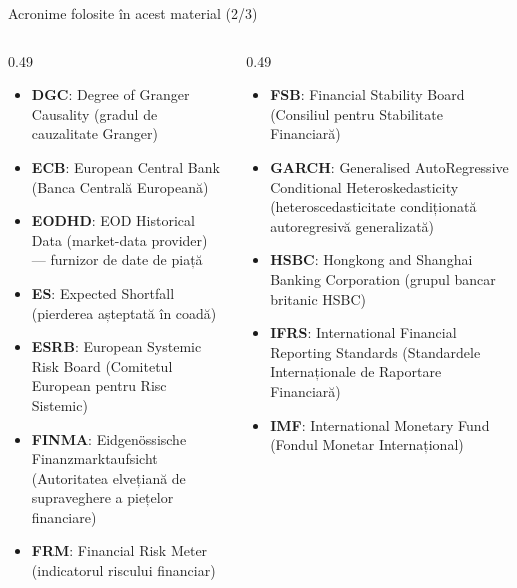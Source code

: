 \begin{frame}{Acronime folosite în acest material (2/3)}
\begin{columns}[T]
\begin{column}{0.49\textwidth}
\begin{itemize}\setlength{\itemsep}{0pt}
    \item \textbf{DGC}: Degree of Granger Causality (gradul de cauzalitate Granger)
    \item \textbf{ECB}: European Central Bank (Banca Centrală Europeană)
    \item \textbf{EODHD}: EOD Historical Data (market-data provider) — furnizor de date de piață
    \item \textbf{ES}: Expected Shortfall (pierderea așteptată în coadă)
    \item \textbf{ESRB}: European Systemic Risk Board (Comitetul European pentru Risc Sistemic)
    \item \textbf{FINMA}: Eidgenössische Finanzmarktaufsicht (Autoritatea elvețiană de supraveghere a piețelor financiare)
    \item \textbf{FRM}: Financial Risk Meter (indicatorul riscului financiar)
\end{itemize}
\end{column}
\begin{column}{0.49\textwidth}
\begin{itemize}\setlength{\itemsep}{0pt}
    \item \textbf{FSB}: Financial Stability Board (Consiliul pentru Stabilitate Financiară)
    \item \textbf{GARCH}: Generalised AutoRegressive Conditional Heteroskedasticity (heteroscedasticitate condiționată autoregresivă generalizată)
    \item \textbf{HSBC}: Hongkong and Shanghai Banking Corporation (grupul bancar britanic HSBC)
    \item \textbf{IFRS}: International Financial Reporting Standards (Standardele Internaționale de Raportare Financiară)
    \item \textbf{IMF}: International Monetary Fund (Fondul Monetar Internațional)
\end{itemize}
\end{column}
\end{columns}
\end{frame}
